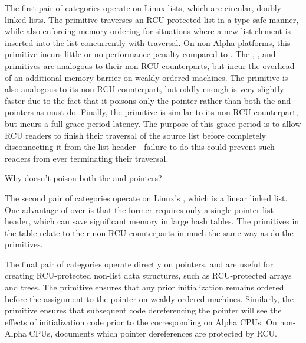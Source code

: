 The first pair of categories operate on Linux
 lists, which are circular, doubly-linked
lists.
The  primitive traverses an
RCU-protected list in a type-safe manner, while also enforcing
memory ordering for situations where a new list element is inserted
into the list concurrently with traversal.
On non-Alpha platforms, this primitive incurs little or no performance
penalty compared to .
The , ,
and  primitives are analogous to
their non-RCU counterparts, but incur the overhead of an additional
memory barrier on weakly-ordered machines.
The  primitive is also analogous to its
non-RCU counterpart, but oddly enough is very slightly faster due to the
fact that it poisons only the  pointer rather than
both the  and  pointers as
 must do.
Finally, the  primitive is similar
to its non-RCU counterpart, but incurs a full grace-period latency.
The purpose of this grace period is to allow RCU readers to finish
their traversal of the source list before completely disconnecting
it from the list header---failure to do this could prevent such
readers from ever terminating their traversal.

\QuickQuiz{}
	Why doesn't  poison both the 
	and  pointers?
 \QuickQuizEnd

The second pair of categories operate on Linux's
, which is a linear linked list.
One advantage of  over
 is that the former requires only
a single-pointer list header, which can save significant memory in
large hash tables.
The  primitives in the table
relate to their non-RCU counterparts in much the same way as do the
 primitives.

The final pair of categories operate directly on pointers, and
are useful for creating RCU-protected non-list data structures,
such as RCU-protected arrays and trees.
The  primitive ensures that any
prior initialization remains ordered before the assignment to the
pointer on weakly ordered machines.
Similarly, the  primitive ensures that subsequent
code dereferencing the pointer will see the effects of initialization code
prior to the corresponding  on
Alpha CPUs.
On non-Alpha CPUs,  documents which pointer
dereferences are protected by RCU.

